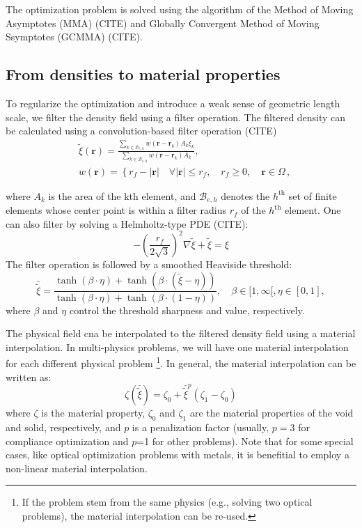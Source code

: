 The optimization problem is solved using the algorithm of the Method of Moving
Asymptotes (MMA) (CITE) and Globally Convergent Method of Moving Ssymptotes (GCMMA) (CITE).

\subsection{From densities to material properties}

To regularize the optimization and introduce a weak sense of geometric length scale, we filter
the density field using a filter operation. The filtered density can be calculated using a 
convolution-based filter operation (CITE)
\begin{equation}
    \begin{aligned}
    & \tilde{\xi}(\mathbf{r})=\frac{\sum_{k \in \mathcal{B}_{e, h}} w\left(\mathbf{r}-\mathbf{r}_k\right) A_k \xi_k}{\sum_{k \in \mathcal{B}_{e, h}} w\left(\mathbf{r}-\mathbf{r}_k\right) A_k}, \\
    & w(\mathbf{r})=\left\{r_f-|\mathbf{r}| \quad \forall|\mathbf{r}| \leq r_f, \quad r_f \geq 0, \quad \mathbf{r} \in \Omega\right.\,,
    \end{aligned}
\end{equation}

where $A_k$ is the area of the kth element, and $\mathcal{B}_{e, h}$ denotes the
$h^\text{th}$ set of finite elements whose center point is within a filter radius $r_f$ of the
$h^\text{th}$ element. One can also filter by solving a Helmholtz-type PDE (CITE):
\begin{equation}
    -\left(\frac{r_f}{2 \sqrt{3}}\right)^2 \nabla \tilde{\xi}+\tilde{\xi}=\xi
\end{equation}
The filter operation is followed by a smoothed Heaviside threshold:
\begin{equation}
    \bar{\tilde{\xi}}=\frac{\tanh (\beta \cdot \eta)+\tanh (\beta \cdot(\tilde{\xi}-\eta))}{\tanh (\beta \cdot \eta)+\tanh (\beta \cdot(1-\eta))}, \quad \beta \in[1, \infty[, \eta \in[0,1],
\end{equation}
where $\beta$ and $\eta$ control the threshold sharpness and value, respectively.

The physical field cna be interpolated to the filtered density field using a material interpolation.
In multi-physics problems, we will have one material interpolation for each different physical problem
\footnote{If the problem stem from the same physics (e.g., solving two optical problems), the material interpolation can be re-used.}.
In general, the material interpolation can be written as:
\begin{equation}
    \zeta(\bar{\tilde{\xi}})=\zeta_0+\bar{\tilde{\xi}}^p\left(\zeta_1-\zeta_0\right)
\end{equation}
where $\zeta$ is the material property, $\zeta_0$ and $\zeta_1$ are the material properties of the void and solid, respectively, and $p$
is a penalization factor (usually, $p=3$ for compliance optimization and $p$=1 for other problems). Note that for some
special cases, like optical optimization problems with metals, it is benefitial to employ a non-linear material interpolation.

